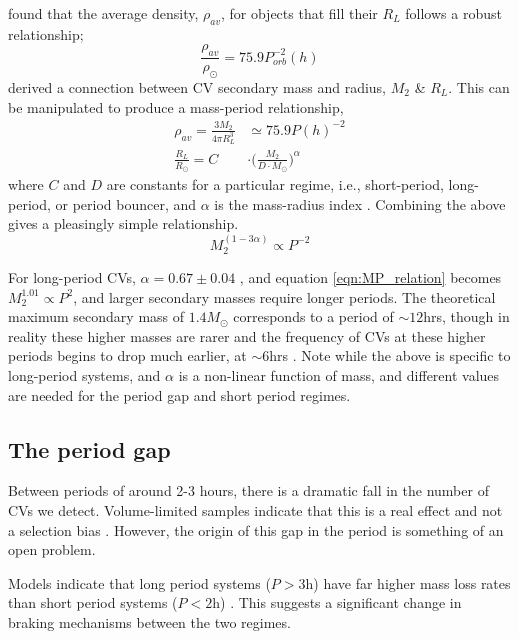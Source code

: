\citet{warner1995} found that the average density, $\rho_{av}$, for objects that fill their $R_L$ follows a robust relationship;
\begin{equation}
    \frac{\rho_{av}}{\rho_{\odot}} = 75.9 P_{orb}^{-2}(h)
\end{equation}
\citet{knigge11} derived a connection between CV secondary mass and radius, $M_2$ \& $R_L$. This can be manipulated to produce a mass-period relationship,
\begin{align}
    \rho_{av} = \frac{3 M_2}{4 \pi R_L^3} &\simeq 75.9 P(h)^{-2} \\
    \frac{R_L}{R_\odot} = C &\cdot \Big( \frac{M_2}{D \cdot M_\odot} \Big) ^{\alpha}
\end{align}
where $C$ and $D$ are constants for a particular regime, i.e., short-period, long-period, or period bouncer, and $\alpha$ is the mass-radius index \citep{Knigge2011b}.
Combining the above gives a pleasingly simple relationship.
\begin{equation}
\label{eqn:MP_relation}
    M_2^{(1-3\alpha)} \propto P^{-2}
\end{equation}

For long-period CVs, $\alpha = 0.67\pm0.04$ \citep{knigge11}, and equation \ref{eqn:MP_relation} becomes $M_2^{1.01} \propto P^{2}$, and larger secondary masses require longer periods. The theoretical maximum secondary mass of $1.4 M_{\odot}$ corresponds to a period of $\sim12$hrs, though in reality these higher masses are rarer and the frequency of CVs at these higher periods begins to drop much earlier, at $\sim6$hrs \citep{gaensicke2009}. Note while the above is specific to long-period systems, and $\alpha$ is a non-linear function of mass, and different values are needed for the period gap and short period regimes.


\subsection{The period gap}
\label{sect:introduction:period gap}

Between periods of around 2-3 hours, there is a dramatic fall in the number of CVs we detect. Volume-limited samples indicate that this is a real effect and not a selection bias \citep{Kolb1998}. However, the origin of this gap in the period is something of an open problem.

Models indicate that long period systems ($P > 3$h) have far higher mass loss rates than short period systems ($P < 2$h) \citep{ritter1985}. This suggests a significant change in braking mechanisms between the two regimes. 

